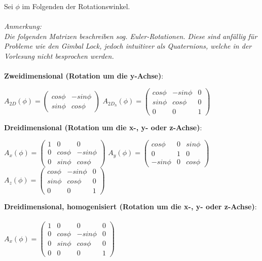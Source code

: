 \documentclass[10pt,a4paper]{article}
\begin{document}
	Sei $\phi$ im Folgenden der Rotationswinkel.\\\\
	\textit{Anmerkung:\\Die folgenden Matrizen beschreiben sog. Euler-Rotationen. Diese sind anfällig für Probleme wie den Gimbal Lock, jedoch intuitiver als Quaternions, welche in der Vorlesung nicht besprochen werden.}\\\\
	\textbf{Zweidimensional (Rotation um die y-Achse)}:
	\begin{center}
		$A_{2D}(\phi) = \begin{pmatrix}cos \phi & -sin \phi \\ sin \phi & cos \phi\end{pmatrix}$\hspace*{0.5cm}
		$A_{2D_h}(\phi) = \begin{pmatrix}cos \phi & -sin \phi & 0 \\ sin \phi & cos \phi & 0 \\ 0 & 0 & 1\end{pmatrix}$\vspace*{0.25cm}
	\end{center}
	\textbf{Dreidimensional (Rotation um die x-, y- oder z-Achse)}:
	\begin{center}
		$A_{x}(\phi) = \begin{pmatrix}1 & 0 & 0\\ 0 & cos \phi & -sin \phi\\ 0 & sin \phi & cos \phi \end{pmatrix}$\hfill
		$A_{y}(\phi) = \begin{pmatrix}cos \phi & 0 & sin \phi\\0 & 1 & 0\\-sin \phi & 0 & cos \phi\end{pmatrix}$\hfill
		$A_{z}(\phi) = \begin{pmatrix}cos \phi & -sin \phi & 0\\ sin \phi & cos \phi & 0 \\ 0 & 0 & 1\end{pmatrix}$\vspace*{0.25cm}\\
	\end{center}
	\textbf{Dreidimensional, homogenisiert (Rotation um die x-, y- oder z-Achse)}:\\\\
	$A_{x}(\phi) = \begin{pmatrix}1 & 0 & 0 & 0\\ 0 & cos \phi & -sin \phi& 0\\ 0 & sin \phi & cos \phi & 0\\ 0 & 0 & 0 & 1\end{pmatrix}$
\end{document}
